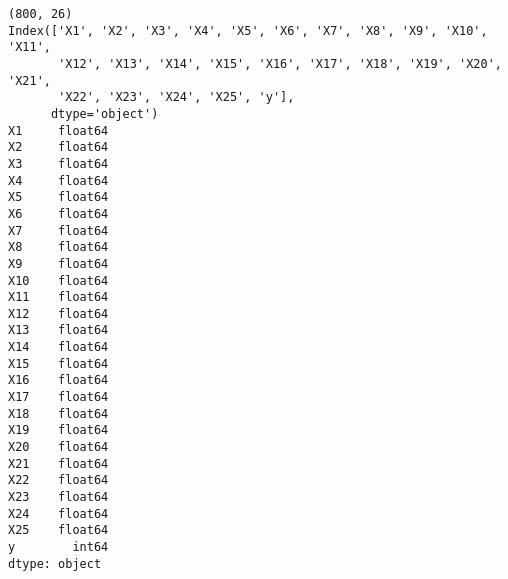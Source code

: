\documentclass[11pt]{article}
\begin{document}
    \begin{Verbatim}[commandchars=\\\{\}]
(800, 26)
Index(['X1', 'X2', 'X3', 'X4', 'X5', 'X6', 'X7', 'X8', 'X9', 'X10', 'X11',
       'X12', 'X13', 'X14', 'X15', 'X16', 'X17', 'X18', 'X19', 'X20', 'X21',
       'X22', 'X23', 'X24', 'X25', 'y'],
      dtype='object')
X1     float64
X2     float64
X3     float64
X4     float64
X5     float64
X6     float64
X7     float64
X8     float64
X9     float64
X10    float64
X11    float64
X12    float64
X13    float64
X14    float64
X15    float64
X16    float64
X17    float64
X18    float64
X19    float64
X20    float64
X21    float64
X22    float64
X23    float64
X24    float64
X25    float64
y        int64
dtype: object

    \end{Verbatim}
\end{document}
